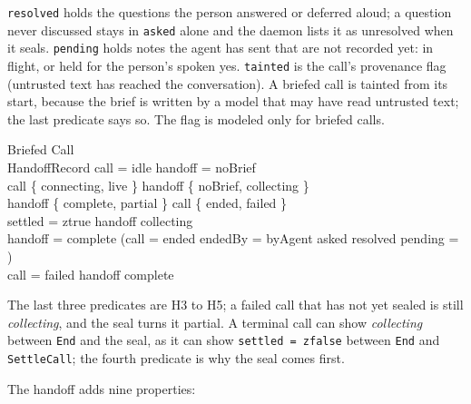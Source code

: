 \documentclass[a4paper,10pt,fleqn]{article}
\begin{document}
\texttt{resolved} holds the questions the person answered or deferred
aloud; a question never discussed stays in \texttt{asked} alone and the
daemon lists it as unresolved when it seals. \texttt{pending} holds notes
the agent has sent that are not recorded yet: in flight, or held for the
person's spoken yes. \texttt{tainted} is the call's provenance flag
(untrusted text has reached the conversation). A briefed call is tainted
from its start, because the brief is written by a model that may have read
untrusted text; the last predicate says so. The flag is modeled only for
briefed calls.

\begin{schema}{Briefed}
  Call \\
  HandoffRecord
\where
  call = idle \implies handoff = noBrief \\
  call \in \{ connecting, live \} \implies handoff \in \{ noBrief, collecting \} \\
  handoff \in \{ complete, partial \} \implies call \in \{ ended, failed \} \\
  settled = ztrue \implies handoff \neq collecting \\
  handoff = complete \implies
    (call = ended \land endedBy = byAgent \land asked \subseteq resolved
      \land pending = \emptyset) \\
  call = failed \implies handoff \neq complete
\end{schema}

The last three predicates are H3 to H5; a failed call that has not yet
sealed is still \emph{collecting}, and the seal turns it partial. A terminal call can show
\emph{collecting} between \texttt{End} and the seal, as it can show
\texttt{settled = zfalse} between \texttt{End} and \texttt{SettleCall};
the fourth predicate is why the seal comes first.

The handoff adds nine properties:
\end{document}
